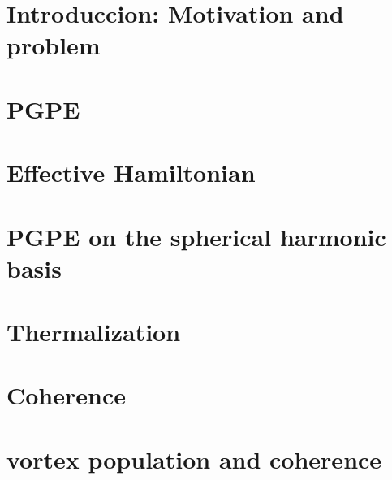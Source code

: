 \documentclass[11pt,a4paper]{article}
\begin{document}
 
{\sf 
\section{Introduccion: Motivation and problem}
\section{PGPE}
\section{Effective Hamiltonian}
\section{PGPE on the spherical harmonic basis}
\section{Thermalization}
\section{Coherence}
\section{vortex population and coherence}

}
\end{document}
